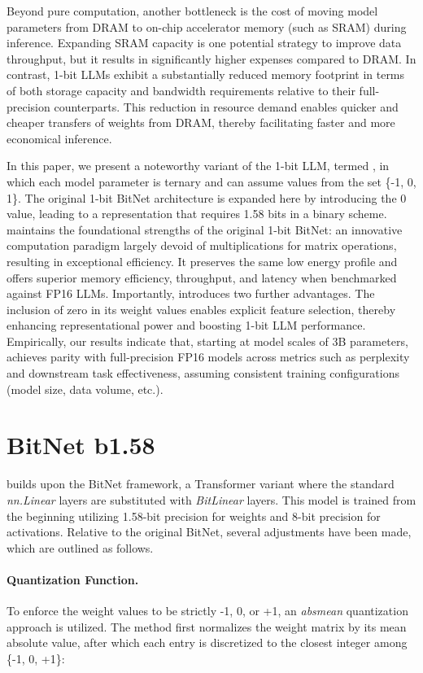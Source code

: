 Beyond pure computation, another bottleneck is the cost of moving model parameters from DRAM to on-chip accelerator memory (such as SRAM) during inference. Expanding SRAM capacity is one potential strategy to improve data throughput, but it results in significantly higher expenses compared to DRAM. In contrast, 1-bit LLMs exhibit a substantially reduced memory footprint in terms of both storage capacity and bandwidth requirements relative to their full-precision counterparts. This reduction in resource demand enables quicker and cheaper transfers of weights from DRAM, thereby facilitating faster and more economical inference.

In this paper, we present a noteworthy variant of the 1-bit LLM, termed \textbf{}, in which each model parameter is ternary and can assume values from the set \{-1, 0, 1\}. The original 1-bit BitNet architecture is expanded here by introducing the 0 value, leading to a representation that requires 1.58 bits in a binary scheme.  maintains the foundational strengths of the original 1-bit BitNet: an innovative computation paradigm largely devoid of multiplications for matrix operations, resulting in exceptional efficiency. It preserves the same low energy profile and offers superior memory efficiency, throughput, and latency when benchmarked against FP16 LLMs. Importantly,  introduces two further advantages. The inclusion of zero in its weight values enables explicit feature selection, thereby enhancing representational power and boosting 1-bit LLM performance. Empirically, our results indicate that, starting at model scales of 3B parameters,  achieves parity with full-precision FP16 models across metrics such as perplexity and downstream task effectiveness, assuming consistent training configurations (model size, data volume, etc.).

\section{BitNet b1.58}

 builds upon the BitNet framework, a Transformer variant where the standard \emph{nn.Linear} layers are substituted with \emph{BitLinear} layers. This model is trained from the beginning utilizing 1.58-bit precision for weights and 8-bit precision for activations. Relative to the original BitNet, several adjustments have been made, which are outlined as follows.

\paragraph{Quantization Function.} To enforce the weight values to be strictly -1, 0, or +1, an \emph{absmean} quantization approach is utilized. The method first normalizes the weight matrix by its mean absolute value, after which each entry is discretized to the closest integer among \{-1, 0, +1\}:

